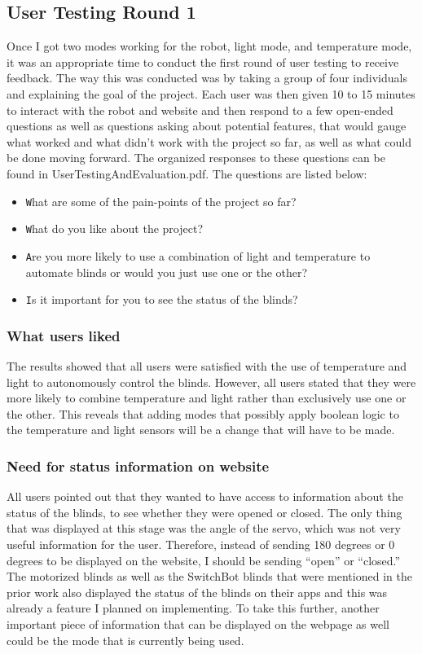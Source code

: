 \documentclass[10pt,twocolumn]{article}
\begin{document}
\subsection{User Testing Round 1}
Once I got two modes working for the robot, light mode, and temperature mode, it was an appropriate time to conduct the first round of user testing to receive feedback. The way this was conducted was by taking a group of four individuals and explaining the goal of the project. Each user was then given 10 to 15 minutes to interact with the robot and website and then respond to a few open-ended questions as well as questions asking about potential features, that would gauge what worked and what didn’t work with the project so far, as well as what could be done moving forward. The organized responses to these questions can be found in UserTestingAndEvaluation.pdf. The questions are listed below:

\begin{itemize}
    \item \texttt What are some of the pain-points of the project so far?
    \item \texttt What do you like about the project?
    \item \texttt Are you more likely to use a combination of light and temperature to automate blinds or would you just use one or the other?
    \item \texttt Is it important for you to see the status of the blinds?
\end{itemize}

\subsubsection{What users liked}
The results showed that all users were satisfied with the use of temperature and light to autonomously control the blinds. However, all users stated that they were more likely to combine temperature and light rather than exclusively use one or the other. This reveals that adding modes that possibly apply boolean logic to the temperature and light sensors will be a change that will have to be made.

\subsubsection{Need for status information on website}
All users pointed out that they wanted to have access to information about the status of the blinds, to see whether they were opened or closed. The only thing that was displayed at this stage was the angle of the servo, which was not very useful information for the user. Therefore, instead of sending 180 degrees or 0 degrees to be displayed on the website, I should be sending “open” or “closed.” The motorized blinds as well as the SwitchBot blinds that were mentioned in the prior work also displayed the status of the blinds on their apps and this was already a feature I planned on implementing. To take this further, another important piece of information that can be displayed on the webpage as well could be the mode that is currently being used.
\end{document}
